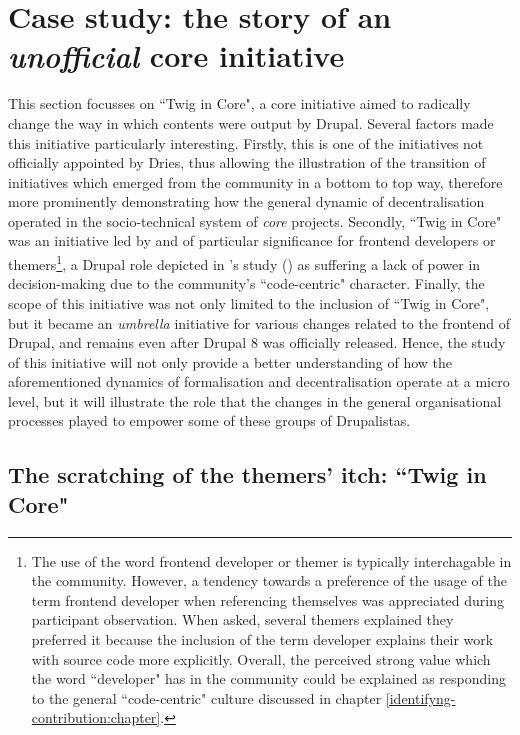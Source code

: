 \section{Case study: the story of an \textit{unofficial} core initiative}
\label{subsec:dec-core-initiative}

This section focusses on ``Twig in Core", a core initiative aimed to radically change the way in which contents were output by Drupal. Several factors made this initiative particularly interesting. Firstly, this is one of the initiatives not officially appointed by Dries, thus allowing the illustration of the transition of initiatives which emerged from the community in a bottom to top way, therefore more prominently demonstrating how the general dynamic of decentralisation operated in the socio-technical system of \textit{core} projects. Secondly, ``Twig in Core" was an initiative led by and of particular significance for frontend developers or themers\footnote{The use of the word frontend developer or themer is typically interchagable in the community. However, a tendency towards a preference of the usage of the term frontend developer when referencing themselves was appreciated during participant observation. When asked, several themers explained they preferred it because the  inclusion of the term developer explains their work with source code more explicitly. Overall, the perceived strong value which the word ``developer" has in the community could be explained as responding to the general ``code-centric" culture discussed in chapter \ref{identifyng-contribution:chapter}.}, a Drupal role depicted in \citeauthor{Zilouchian2011}'s study (\citeyear{Zilouchian2011}) as suffering a lack of power in decision-making due to the community's ``code-centric" character. Finally, the scope of this initiative was not only limited to the inclusion of ``Twig in Core", but it became an \textit{umbrella} initiative for various changes related to the frontend of Drupal, and remains even after Drupal 8 was officially released. Hence, the study of this initiative will not only provide a better understanding of how the aforementioned dynamics of formalisation and decentralisation operate at a micro level, but it will illustrate the role that the changes in the general organisational processes played to empower some of these groups of Drupalistas.

\subsection{The scratching of the themers' itch: ``Twig in Core"}
\label{subsec:themers-itch}

